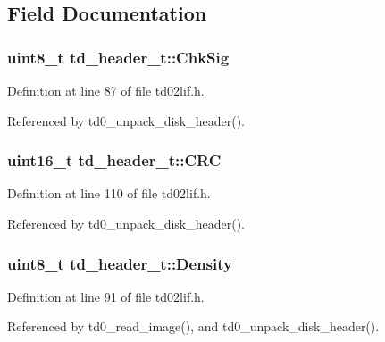 \subsection{Field Documentation}
\subsubsection[{\texorpdfstring{Chk\+Sig}{ChkSig}}]{\setlength{\rightskip}{0pt plus 5cm}uint8\+\_\+t td\+\_\+header\+\_\+t\+::\+Chk\+Sig}\hypertarget{structtd__header__t_ad226c52f8f8481b0ebf826dd3128ba3d}{}\label{structtd__header__t_ad226c52f8f8481b0ebf826dd3128ba3d}


Definition at line 87 of file td02lif.\+h.



Referenced by td0\+\_\+unpack\+\_\+disk\+\_\+header().

\subsubsection[{\texorpdfstring{C\+RC}{CRC}}]{\setlength{\rightskip}{0pt plus 5cm}uint16\+\_\+t td\+\_\+header\+\_\+t\+::\+C\+RC}\hypertarget{structtd__header__t_ae51197a200b65947359773f1aeea9c2d}{}\label{structtd__header__t_ae51197a200b65947359773f1aeea9c2d}


Definition at line 110 of file td02lif.\+h.



Referenced by td0\+\_\+unpack\+\_\+disk\+\_\+header().

\subsubsection[{\texorpdfstring{Density}{Density}}]{\setlength{\rightskip}{0pt plus 5cm}uint8\+\_\+t td\+\_\+header\+\_\+t\+::\+Density}\hypertarget{structtd__header__t_a09c0c52ec99733db61dd6f3c7d052325}{}\label{structtd__header__t_a09c0c52ec99733db61dd6f3c7d052325}


Definition at line 91 of file td02lif.\+h.



Referenced by td0\+\_\+read\+\_\+image(), and td0\+\_\+unpack\+\_\+disk\+\_\+header().

